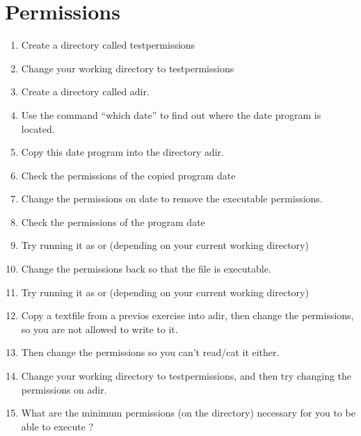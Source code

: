 \documentclass[letterpaper,10pt,english]{sphinxmanual}
\begin{document}
\section{Permissions}
\label{exercises_beginner:permissions}\begin{enumerate}
\item {} 
Create a directory called testpermissions

\item {} 
Change your working directory to testpermissions

\item {} 
Create a directory called adir.

\item {} 
Use the command “which date” to find out where the date program is located.

\item {} 
Copy this date program into the directory adir.

\item {} 
Check the permissions of the copied program date

\item {} 
Change the permissions on date to remove the executable permissions.

\item {} 
Check the permissions of the program date

\item {} 
Try running it as  or  (depending on your current working directory)

\item {} 
Change the permissions back so that the file is executable.

\item {} 
Try running it as  or  (depending on your current working directory)

\item {} 
Copy a textfile from a previos exercise into adir, then change the permissions, so you are not allowed to write to it.

\item {} 
Then change the permissions so you can't read/cat it either.

\item {} 
Change your working directory to testpermissions, and then try changing the permissions on adir.

\item {} 
What are the minimum permissions (on the directory) necessary for you to be able to execute ?

\end{enumerate}
\end{document}
